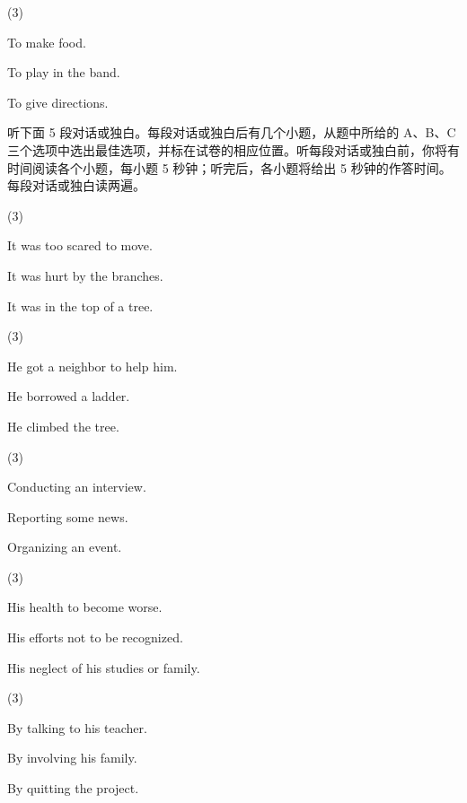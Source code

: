 \documentclass{英语试卷}
\begin{document}
\begin{choices}(3)
  \item To make food.
  \item To play in the band.
  \item To give directions.
\end{choices}
\par 听下面 5 段对话或独白。每段对话或独白后有几个小题，从题中所给的 A、B、C 三个选项中选出最佳选项，并标在试卷的相应位置。听每段对话或独白前，你将有时间阅读各个小题，每小题 5 秒钟；听完后，各小题将给出 5 秒钟的作答时间。每段对话或独白读两遍。\par
{}
\begin{choices}(3)
  \item It was too scared to move.
  \item It was hurt by the branches.
  \item It was in the top of a tree.
\end{choices}
\begin{choices}(3)
  \item He got a neighbor to help him.
  \item He borrowed a ladder.
  \item He climbed the tree.
\end{choices}
\begin{choices}(3)
  \item Conducting an interview.
  \item Reporting some news.
  \item Organizing an event.
\end{choices}
\begin{choices}(3)
  \item His health to become worse.
  \item His efforts not to be recognized.
  \item His neglect of his studies or family.
\end{choices}
\begin{choices}(3)
  \item By talking to his teacher.
  \item By involving his family.
  \item By quitting the project.
\end{choices}
\end{document}
